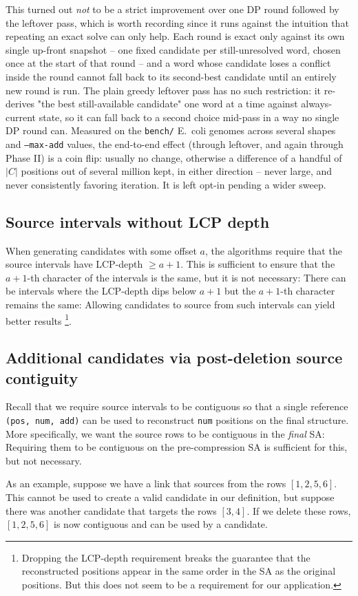 \documentclass[11pt,a4paper]{article}
\begin{document}
This turned out \emph{not} to be a strict improvement over one DP round followed by the leftover pass, which is worth recording since it runs against the intuition that repeating an exact solve can only help. Each round is exact only against its own single up-front snapshot -- one fixed candidate per still-unresolved word, chosen once at the start of that round -- and a word whose candidate loses a conflict inside the round cannot fall back to its second-best candidate until an entirely new round is run. The plain greedy leftover pass has no such restriction: it re-derives "the best still-available candidate" one word at a time against always-current state, so it can fall back to a second choice mid-pass in a way no single DP round can. Measured on the \texttt{bench/} E.\ coli genomes across several shapes and \texttt{--max-add} values, the end-to-end effect (through leftover, and again through Phase II) is a coin flip: usually no change, otherwise a difference of a handful of $|C|$ positions out of several million kept, in either direction -- never large, and never consistently favoring iteration. It is left opt-in pending a wider sweep.

\subsection{Source intervals without LCP depth}

When generating candidates with some offset $a$, the algorithms require that the source intervals have LCP-depth $\geq a + 1$. This is sufficient to ensure that the $a + 1$-th character of the intervals is the same, but it is not necessary: There can be intervals where the LCP-depth dips below $a + 1$ but the $a + 1$-th character remains the same: Allowing candidates to source from such intervals can yield better results
\footnote{
    Dropping the LCP-depth requirement breaks the guarantee that the reconstructed positions appear in the same order in the SA as the original positions. But this does not seem to be a requirement for our application.
}.

\subsection{Additional candidates via post-deletion source contiguity}

Recall that we require source intervals to be contiguous so that a single reference \texttt{(pos, num, add)} can be used to reconstruct \texttt{num} positions on the final structure. More specifically, we want the source rows to be contiguous in the \emph{final} SA: Requiring them to be contiguous on the pre-compression SA is sufficient for this, but not necessary.

As an example, suppose we have a link that sources from the rows $[1, 2, 5, 6]$. This cannot be used to create a valid candidate in our definition, but suppose there was another candidate that targets the rows $[3, 4]$. If we delete these rows, $[1, 2, 5, 6]$ is now contiguous and can be used by a candidate.
\end{document}
